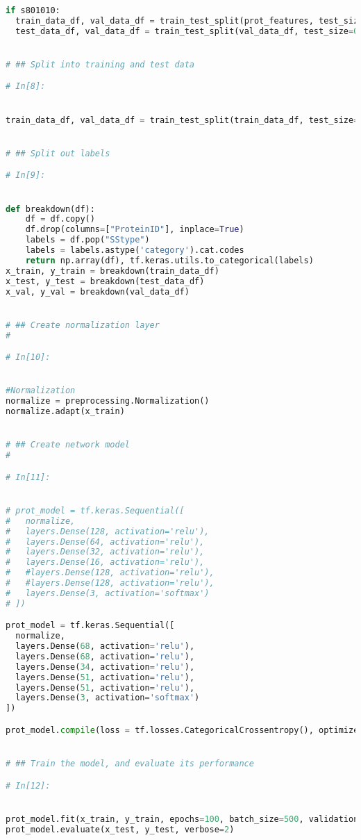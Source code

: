 \documentclass[12pt,letterpaper,oneside,reqno]{book}
\theoremstyle{plain}
\theoremstyle{definition}
\theoremstyle{plain}
\theoremstyle{remark}
\theoremstyle{plain}
\theoremstyle{definition}
\theoremstyle{plain}
\begin{document}
\begin{appendices}
\begin{lstlisting}[language=Python, label=lst:3classfcnnfull, frame=single]
if s801010:
  train_data_df, val_data_df = train_test_split(prot_features, test_size=0.2)
  test_data_df, val_data_df = train_test_split(val_data_df, test_size=0.5)


# ## Split into training and test data

# In[8]:


train_data_df, val_data_df = train_test_split(train_data_df, test_size=0.1)


# ## Split out labels

# In[9]:


def breakdown(df):
    df = df.copy()
    df.drop(columns=["ProteinID"], inplace=True)
    labels = df.pop("SStype")
    labels = labels.astype('category').cat.codes
    return np.array(df), tf.keras.utils.to_categorical(labels)
x_train, y_train = breakdown(train_data_df)
x_test, y_test = breakdown(test_data_df)
x_val, y_val = breakdown(val_data_df)


# ## Create normalization layer
# 

# In[10]:


#Normalization
normalize = preprocessing.Normalization()
normalize.adapt(x_train)


# ## Create network model
# 

# In[11]:


# prot_model = tf.keras.Sequential([
#   normalize,
#   layers.Dense(128, activation='relu'),
#   layers.Dense(64, activation='relu'),
#   layers.Dense(32, activation='relu'),
#   layers.Dense(16, activation='relu'),
#   #layers.Dense(128, activation='relu'),
#   #layers.Dense(128, activation='relu'),
#   layers.Dense(3, activation='softmax')
# ])

prot_model = tf.keras.Sequential([
  normalize,
  layers.Dense(68, activation='relu'),
  layers.Dense(68, activation='relu'),
  layers.Dense(34, activation='relu'),
  layers.Dense(51, activation='relu'),
  layers.Dense(51, activation='relu'),
  layers.Dense(3, activation='softmax')
])

prot_model.compile(loss = tf.losses.CategoricalCrossentropy(), optimizer=tf.optimizers.Adam(), metrics=['categorical_accuracy'])


# ## Train the model, and evaluate its performance

# In[12]:


prot_model.fit(x_train, y_train, epochs=100, batch_size=500, validation_data=(x_val, y_val), callbacks = [tf.keras.callbacks.EarlyStopping(patience = 4)])
prot_model.evaluate(x_test, y_test, verbose=2)



\end{lstlisting}
\end{appendices}
\end{document}
